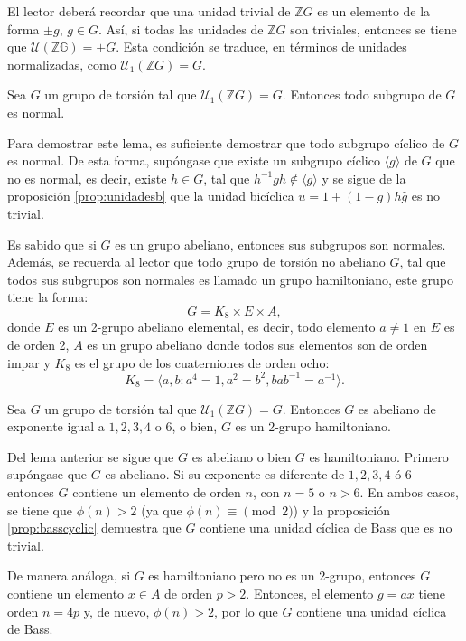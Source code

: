 El lector deberá recordar que una unidad trivial de $\mathds{Z}G$ es un elemento de la forma $\pm g$, $ g \in G$. Así, si todas las unidades de $\mathds{Z}G$ son triviales, entonces se tiene que $\mathcal{U}(\mathds{ZG}) = \pm G$. Esta condición se traduce, en términos de unidades normalizadas, como $\mathcal{U}_1(\mathds{Z}G) = G.$
\begin{lema}
Sea $G$ un grupo de torsión tal que $\mathcal{U}_1(\mathds{Z}G) = G.$ Entonces todo subgrupo de $G$ es normal. 
\end{lema}
\newpage
\begin{proof*}
Para demostrar este lema, es suficiente demostrar que todo subgrupo cíclico de $G$ es normal.  De esta forma, supóngase que existe un subgrupo cíclico $\langle g \rangle$ de $G$ que no es normal, es decir, existe $h \in G$, tal que $h^{-1}gh \notin \langle g \rangle$ y se sigue de la proposición \ref{prop:unidadesb} que la unidad bicíclica $u = 1 + (1-g)h\hat{g}$ es no trivial. 
\end{proof*}
Es sabido que si $G$ es un grupo abeliano, entonces sus subgrupos son normales. Además, se recuerda al lector que todo grupo de torsión no abeliano $G$, tal que todos sus subgrupos son normales es llamado un grupo hamiltoniano, este grupo tiene la forma: \[ G = K_8\times E \times A,\] donde $E$ es un 2-grupo abeliano elemental, es decir, todo elemento $a \neq 1$ en $E$ es de orden 2, $A$ es un grupo abeliano donde todos sus elementos son de orden impar y $K_8$ es el grupo de los cuaterniones de orden ocho: \[ K_8 = \langle a,b \colon a^4 =1 , a^2 = b^2, bab^{-1} = a^{-1} \rangle. \]
\begin{proposicion}
Sea $G$ un grupo de torsión tal que $\mathcal{U}_1(\mathds{Z}G) = G$. Entonces $G$ es abeliano de exponente igual a $1,2,3,4$ o $6$, o bien, $G$ es un 2-grupo hamiltoniano.
\end{proposicion}
\begin{proof*}
Del lema anterior se sigue que $G$ es abeliano o bien  $G$ es hamiltoniano. Primero supóngase que $G$ es abeliano. Si su exponente es diferente de $1,2,3,4$ ó $6$ entonces $G$ contiene un elemento de orden $n$, con $n = 5$ o $n>6$. En ambos casos, se tiene que $\phi(n) > 2$ (ya que $\phi(n) \equiv \pmod{2}$)  y la proposición \ref{prop:basscyclic} demuestra que $G$ contiene una unidad cíclica de Bass que es no trivial.

De manera análoga, si $G$ es hamiltoniano pero no es un 2-grupo, entonces $G$ contiene un elemento $x \in A$ de orden $p>2$. Entonces, el elemento $g = ax$ tiene orden $n=4p$ y, de nuevo, $\phi(n) > 2$, por lo que $G$ contiene una unidad cíclica de Bass. 
\end{proof*}
